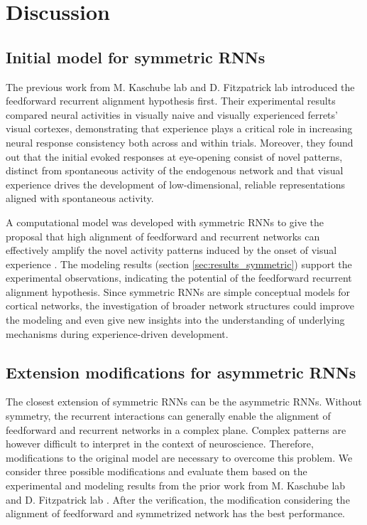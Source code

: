 \documentclass[11pt]{article}
\begin{document}
	\section{Discussion}
	\subsection*{Initial model for symmetric RNNs}
	The previous work from M. Kaschube lab and D. Fitzpatrick lab \cite{tragenap2023nature} introduced the feedforward recurrent alignment hypothesis first. Their experimental results compared neural activities in visually naive and visually experienced ferrets' visual cortexes, demonstrating that experience plays a critical role in increasing neural response consistency both across and within trials. Moreover, they found out that the initial evoked responses at eye-opening consist of novel patterns, distinct from spontaneous activity of the endogenous network and that visual experience drives the development of low-dimensional, reliable representations aligned with spontaneous activity. 
	
	A computational model was developed with symmetric RNNs to give the proposal that high alignment of feedforward and recurrent networks can effectively amplify the novel activity patterns induced by the onset of visual experience \cite{tragenap2023nature}. The modeling results (section \ref{sec:results_symmetric}) support the experimental observations, indicating the potential of the feedforward recurrent alignment hypothesis. Since symmetric RNNs are simple conceptual models for cortical networks, the investigation of broader network structures could improve the modeling and even give new insights into the understanding of underlying mechanisms during experience-driven development. 
	
	\subsection*{Extension modifications for asymmetric RNNs}
	The closest extension of symmetric RNNs can be the asymmetric RNNs. Without symmetry, the recurrent interactions can generally enable the alignment of feedforward and recurrent networks in a complex plane. Complex patterns are however difficult to interpret in the context of neuroscience. Therefore, modifications to the original model are necessary to overcome this problem. We consider three possible modifications and evaluate them based on the experimental and modeling results from the prior work from M. Kaschube lab and D. Fitzpatrick lab \cite{tragenap2023nature}. After the verification, the modification considering the alignment of feedforward and symmetrized network has the best performance. 
	
\end{document}
